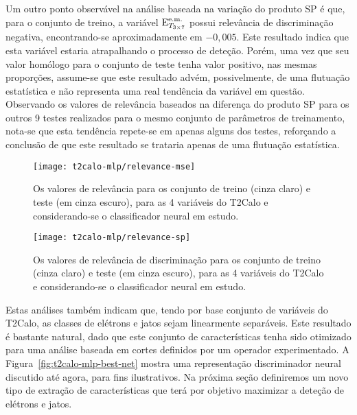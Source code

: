 Um outro ponto observável na análise baseada na variação do produto SP é que,
para o conjunto de treino, a variável $\text{E}^{\text{e.m.}}_{T_{3\times7}}$ possui relevância de
discriminação negativa, encontrando-se aproximadamente em $-0,005$. Este
resultado indica que esta variável estaria atrapalhando o processo de deteção.
Porém, uma vez que seu valor homólogo para o conjunto de teste tenha valor
positivo, nas mesmas proporções, assume-se que este resultado advém,
possivelmente, de uma flutuação estatística e não representa uma real
tendência da variável em questão. Observando os valores de relevância baseados
na diferença do produto SP para os outros 9 testes realizados para o mesmo
conjunto de parâmetros de treinamento, nota-se que esta tendência repete-se em
apenas alguns dos testes, reforçando a conclusão de que este resultado se
trataria apenas de uma flutuação estatística.

\begin{figure}
\begin{center}
\texttt{[image: t2calo-mlp/relevance-mse]}
\end{center}
\caption{Os valores de relevância para os conjunto de treino
(cinza claro) e teste (em cinza escuro), para as 4 variáveis do T2Calo e
considerando-se o classificador neural em estudo.}
\label{fig:best-t2calo-mse-relevance}
\end{figure}

\begin{figure}
\begin{center}
\texttt{[image: t2calo-mlp/relevance-sp]}
\end{center}
\caption{Os valores de relevância de discriminação para os conjunto de treino
(cinza claro) e teste (em cinza escuro), para as 4 variáveis do T2Calo e
considerando-se o classificador neural em estudo.}
\label{fig:best-t2calo-sp-relevance}
\end{figure}

Estas análises também indicam que, tendo por base conjunto de variáveis do
T2Calo, as classes de elétrons e jatos sejam linearmente separáveis. Este
resultado é bastante natural, dado que este conjunto de características tenha
sido otimizado para uma análise baseada em cortes definidos por um operador
experimentado. A Figura~\ref{fig:t2calo-mlp-best-net} mostra uma representação
discriminador neural discutido até agora, para fins ilustrativos. Na próxima
seção definiremos um novo tipo de extração de características que terá por
objetivo maximizar a deteção de elétrons e jatos.

